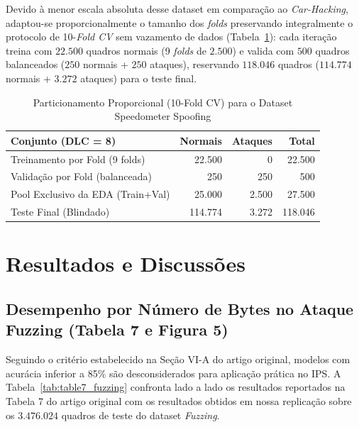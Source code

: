 \documentclass[conference]{IEEEtran}
\begin{document}
Devido à menor escala absoluta desse dataset em comparação ao \textit{Car-Hacking}, adaptou-se proporcionalmente o tamanho dos \textit{folds} preservando integralmente o protocolo de 10-\textit{Fold CV} sem vazamento de dados (Tabela~\ref{tab:splits_spd}): cada iteração treina com $22.500$ quadros normais (9 \textit{folds} de $2.500$) e valida com $500$ quadros balanceados ($250$ normais + $250$ ataques), reservando $118.046$ quadros ($114.774$ normais + $3.272$ ataques) para o teste final.

\begin{table}[htbp]
\caption{Particionamento Proporcional (10-Fold CV) para o Dataset Speedometer Spoofing}
\label{tab:splits_spd}
\centering
\scriptsize
\setlength{\tabcolsep}{4pt}
\begin{tabular}{lrrr}
\toprule
\textbf{Conjunto (DLC = 8)} & \textbf{Normais} & \textbf{Ataques} & \textbf{Total} \\
\midrule
Treinamento por Fold (9 folds) & 22.500 & 0 & 22.500 \\
Validação por Fold (balanceada) & 250 & 250 & 500 \\
Pool Exclusivo da EDA (Train+Val) & 25.000 & 2.500 & 27.500 \\
Teste Final (Blindado) & 114.774 & 3.272 & 118.046 \\
\bottomrule
\end{tabular}
\end{table}

\section{Resultados e Discussões}

\subsection{Desempenho por Número de Bytes no Ataque Fuzzing (Tabela 7 e Figura 5)}
Seguindo o critério estabelecido na Seção VI-A do artigo original, modelos com acurácia inferior a 85\% são desconsiderados para aplicação prática no IPS. A Tabela~\ref{tab:table7_fuzzing} confronta lado a lado os resultados reportados na Tabela 7 do artigo original com os resultados obtidos em nossa replicação sobre os $3.476.024$ quadros de teste do dataset \textit{Fuzzing}.
\end{document}
